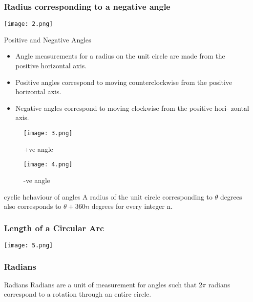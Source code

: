 \documentclass{beamer}
\begin{document}
\begin{frame}
    \frametitle{Radius corresponding to a negative angle}
    \centering
    \texttt{[image: 2.png]}

\end{frame}

\begin{frame}
    \begin{block}{Positive and Negative Angles}
        \begin{itemize}
            \item Angle measurements for a radius on the unit circle are made from the
            positive horizontal axis.
            \item Positive angles correspond to moving counterclockwise from the positive
            horizontal axis.
            \item Negative angles correspond to moving clockwise from the positive hori-
            zontal axis.
        \end{itemize}
    \end{block}
\end{frame}

\begin{frame}
    \begin{figure}[h]    
        \begin{minipage}[b]{0.3\textwidth}
        \centering
        \texttt{[image: 3.png]}
        \caption{+ve angle}
    \end{minipage}
    \begin{minipage}[b]{0.3\textwidth}
        \centering
        \texttt{[image: 4.png]}
        \caption{-ve angle}
    \end{minipage}
\end{figure}
\begin{block}{cyclic hehaviour of angles}
    A radius of the unit circle corresponding to $\theta$ degrees also corresponds to
$\theta + 360n$ degrees for every integer n.
\end{block}
\end{frame}


\begin{frame}
    \frametitle{Length of a Circular Arc}
    \centering
    \texttt{[image: 5.png]}
\end{frame}

\begin{frame}
    \frametitle{Radians}
   \begin{block}{Radians}
    Radians are a unit of measurement for angles such that $2\pi$ radians correspond
    to a rotation through an entire circle.
   \end{block}
\end{frame}
\end{document}
